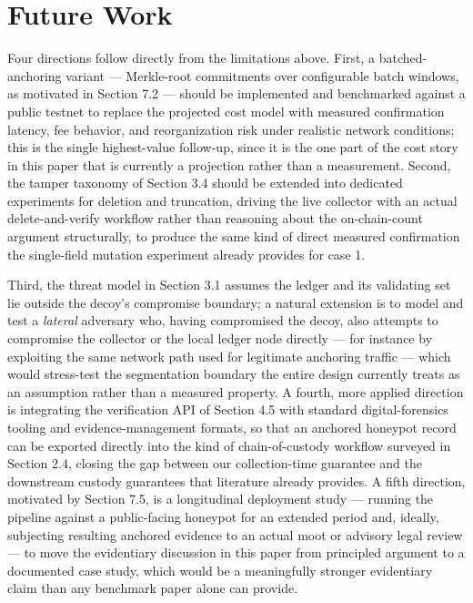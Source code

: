 \documentclass[journal]{IEEEtran}
\begin{document}
\section{Future Work}

Four directions follow directly from the limitations above. First, a batched-anchoring variant --- Merkle-root commitments over configurable batch windows, as motivated in Section 7.2 --- should be implemented and benchmarked against a public testnet to replace the projected cost model with measured confirmation latency, fee behavior, and reorganization risk under realistic network conditions; this is the single highest-value follow-up, since it is the one part of the cost story in this paper that is currently a projection rather than a measurement. Second, the tamper taxonomy of Section 3.4 should be extended into dedicated experiments for deletion and truncation, driving the live collector with an actual delete-and-verify workflow rather than reasoning about the on-chain-count argument structurally, to produce the same kind of direct measured confirmation the single-field mutation experiment already provides for case 1.

Third, the threat model in Section 3.1 assumes the ledger and its validating set lie outside the decoy's compromise boundary; a natural extension is to model and test a \emph{lateral} adversary who, having compromised the decoy, also attempts to compromise the collector or the local ledger node directly --- for instance by exploiting the same network path used for legitimate anchoring traffic --- which would stress-test the segmentation boundary the entire design currently treats as an assumption rather than a measured property. A fourth, more applied direction is integrating the verification API of Section 4.5 with standard digital-forensics tooling and evidence-management formats, so that an anchored honeypot record can be exported directly into the kind of chain-of-custody workflow surveyed in Section 2.4, closing the gap between our collection-time guarantee and the downstream custody guarantees that literature already provides. A fifth direction, motivated by Section 7.5, is a longitudinal deployment study --- running the pipeline against a public-facing honeypot for an extended period and, ideally, subjecting resulting anchored evidence to an actual moot or advisory legal review --- to move the evidentiary discussion in this paper from principled argument to a documented case study, which would be a meaningfully stronger evidentiary claim than any benchmark paper alone can provide.
\end{document}
